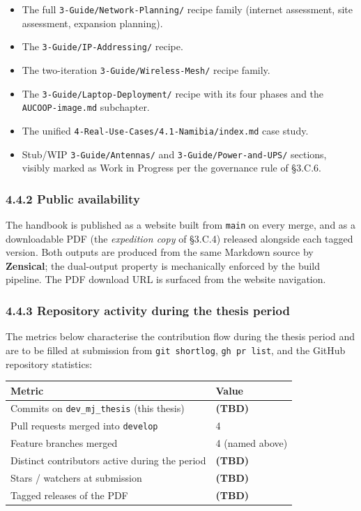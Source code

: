 \begin{itemize}
\tightlist
\item
  The full \texttt{3-Guide/Network-Planning/} recipe family (internet
  assessment, site assessment, expansion planning).
\item
  The \texttt{3-Guide/IP-Addressing/} recipe.
\item
  The two-iteration \texttt{3-Guide/Wireless-Mesh/} recipe family.
\item
  The \texttt{3-Guide/Laptop-Deployment/} recipe with its four phases
  and the \texttt{AUCOOP-image.md} subchapter.
\item
  The unified \texttt{4-Real-Use-Cases/4.1-Namibia/index.md} case study.
\item
  Stub/WIP \texttt{3-Guide/Antennas/} and
  \texttt{3-Guide/Power-and-UPS/} sections, visibly marked as Work in
  Progress per the governance rule of §3.C.6.
\end{itemize}

\hypertarget{public-availability}{%
\subsubsection{4.4.2 Public availability}\label{public-availability}}

The handbook is published as a website built from \texttt{main} on every
merge, and as a downloadable PDF (the \emph{expedition copy} of §3.C.4)
released alongside each tagged version. Both outputs are produced from
the same Markdown source by \textbf{Zensical}; the dual-output property
is mechanically enforced by the build pipeline. The PDF download URL is
surfaced from the website navigation.

\hypertarget{repository-activity-during-the-thesis-period}{%
\subsubsection{4.4.3 Repository activity during the thesis
period}\label{repository-activity-during-the-thesis-period}}

The metrics below characterise the contribution flow during the thesis
period and are to be filled at submission from \texttt{git\ shortlog},
\texttt{gh\ pr\ list}, and the GitHub repository statistics:

\begin{longtable}[]{@{}ll@{}}
\toprule\noalign{}
Metric & Value \\
\midrule\noalign{}
\endhead
\bottomrule\noalign{}
\endlastfoot
Commits on \texttt{dev\_mj\_thesis} (this thesis) & \textbf{(TBD)} \\
Pull requests merged into \texttt{develop} & 4 \\
Feature branches merged & 4 (named above) \\
Distinct contributors active during the period & \textbf{(TBD)} \\
Stars / watchers at submission & \textbf{(TBD)} \\
Tagged releases of the PDF & \textbf{(TBD)} \\
\end{longtable}

